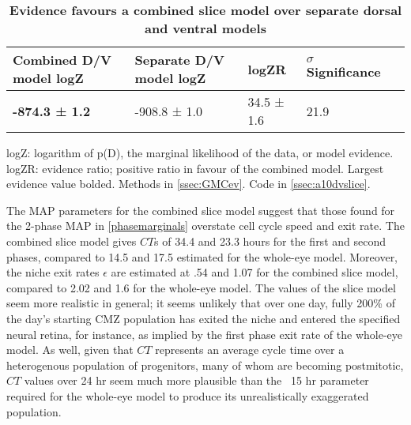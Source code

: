 \begin{table}[!ht]
    \centering
    \caption{{\bf Evidence favours a combined slice model over separate dorsal and ventral models}}
    \begin{tabular}{|l|l|l|l|l|}
        \hline
        {\bf Combined D/V model logZ} & {\bf Separate D/V model logZ} & {\bf logZR} & {\bf $\sigma$ Significance}\\ \hline
        \textbf{-874.3 ± 1.2} & -908.8 ± 1.0 & 34.5 ± 1.6 & 21.9\\ \hline
    \end{tabular}
    \begin{flushleft} logZ: logarithm of p(D), the marginal likelihood of the data, or model evidence. logZR: evidence ratio; positive ratio in favour of the combined model. Largest evidence value bolded.
    Methods in \autoref{ssec:GMCev}.
    Code in \autoref{ssec:a10dvslice}.     
    \end{flushleft}
    \label{dvtable}
\end{table}

The MAP parameters for the combined slice model suggest that those found for the 2-phase MAP in \autoref{phasemarginals} overstate cell cycle speed and exit rate. The combined slice model gives $CT$s of 34.4 and 23.3 hours for the first and second phases, compared to 14.5 and 17.5 estimated for the whole-eye model. Moreover, the niche exit rates $\epsilon$ are estimated at .54 and 1.07 for the combined slice model, compared to 2.02 and 1.6 for the whole-eye model. The values of the slice model seem more realistic in general; it seems unlikely that over one day, fully 200\% of the day's starting CMZ population has exited the niche and entered the specified neural retina, for instance, as implied by the first phase exit rate of the whole-eye model. As well, given that $CT$ represents an average cycle time over a heterogenous population of progenitors, many of whom are becoming postmitotic, $CT$ values over 24 hr seem much more plausible than the ~15 hr parameter required for the whole-eye model to produce its unrealistically exaggerated population.

